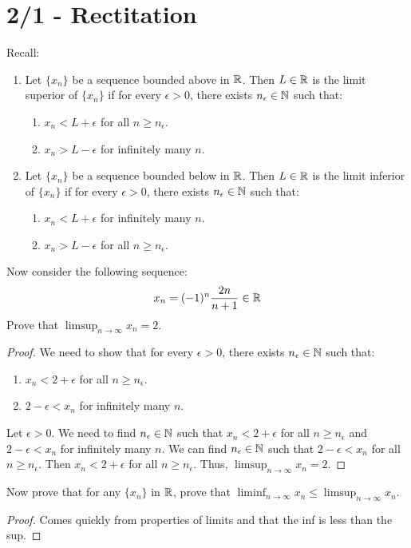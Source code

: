 \documentclass{report}
\begin{document}
\section{2/1 - Rectitation}
Recall:
\begin{enumerate}
    \item Let $\{x_n\}$ be a sequence bounded above in $\RR$. Then $L \in \RR$ is the limit superior of $\{x_n\}$ if for every $\epsilon > 0$, there exists $n_\epsilon \in \NN$ such that:
    \begin{enumerate}
        \item $x_n < L + \epsilon$ for all $n \geq n_\epsilon$.
        \item $ x_n > L - \epsilon$ for infinitely many $n$.
    \end{enumerate}
    \item Let $\{x_n\}$ be a sequence bounded below in $\RR$. Then $L \in \RR$ is the limit inferior of $\{x_n\}$ if for every $\epsilon > 0$, there exists $n_\epsilon \in \NN$ such that:
    \begin{enumerate}
        \item $x_n < L + \epsilon$ for infinitely many $n$.
        \item $x_n > L - \epsilon$ for all $n \geq n_\epsilon$.
    \end{enumerate}
\end{enumerate}
Now consider the following sequence: \[ x_n = (-1)^n \frac{2n}{n+1} \in \RR\]
Prove that $\limsup_{n \to \infty} x_n = 2$.
\begin{proof}
    We need to show that for every $\epsilon > 0$, there exists $n_\epsilon \in \NN$ such that:
    \begin{enumerate}
        \item $x_n < 2 + \epsilon$ for all $n \geq n_\epsilon$.
        \item $2 - \epsilon < x_n$ for infinitely many $n$.
    \end{enumerate}
    Let $\epsilon > 0$. We need to find $n_\epsilon \in \NN$ such that $x_n < 2 + \epsilon$ for all $n \geq n_\epsilon$ and $2 - \epsilon < x_n$ for infinitely many $n$. We can find $n_\epsilon \in \NN$ such that $2 - \epsilon < x_n$ for all $n \geq n_\epsilon$. Then $x_n < 2 + \epsilon$ for all $n \geq n_\epsilon$. Thus, $\limsup_{n \to \infty} x_n = 2$.
\end{proof}

\noindent Now prove that for any $\{x_n\}$ in $\RR$, prove that $\liminf_{n \to \infty} x_n \leq \limsup_{n \to \infty} x_n$.
\begin{proof}
    Comes quickly from properties of limits and that the inf is less than the sup.
\end{proof}
\end{document}
